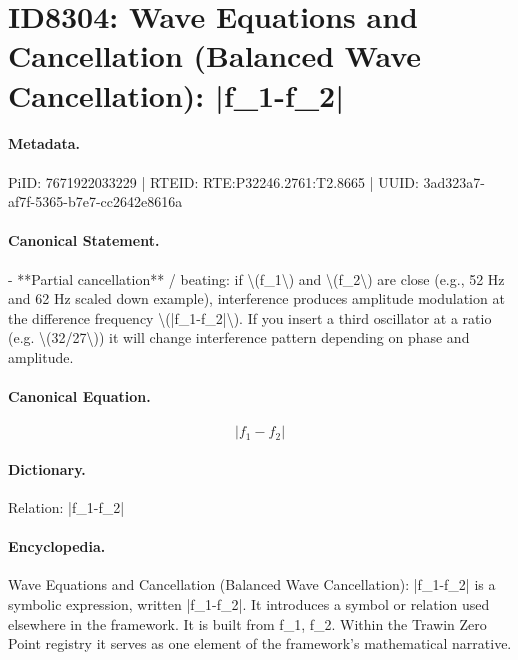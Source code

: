 \section*{ID8304: Wave Equations and Cancellation (Balanced Wave Cancellation): |f\_1-f\_2|}
\paragraph{Metadata.}
PiID: 7671922033229 | RTEID: RTE:P32246.2761:T2.8665 | UUID: 3ad323a7-af7f-5365-b7e7-cc2642e8616a

\paragraph{Canonical Statement.}
- **Partial cancellation** / beating: if \textbackslash{}(f\_1\textbackslash{}) and \textbackslash{}(f\_2\textbackslash{}) are close (e.g., 52 Hz and 62 Hz scaled down example), interference produces amplitude modulation at the difference frequency \textbackslash{}(|f\_1-f\_2|\textbackslash{}). If you insert a third oscillator at a ratio (e.g. \textbackslash{}(32/27\textbackslash{})) it will change interference pattern depending on phase and amplitude.

\paragraph{Canonical Equation.}
\[
|f_1-f_2|
\]

\paragraph{Dictionary.}
Relation: |f\_1-f\_2|

\paragraph{Encyclopedia.}
Wave Equations and Cancellation (Balanced Wave Cancellation): |f\_1-f\_2| is a symbolic expression, written |f\_1-f\_2|. It introduces a symbol or relation used elsewhere in the framework. It is built from f\_1, f\_2. Within the Trawin Zero Point registry it serves as one element of the framework's mathematical narrative.
